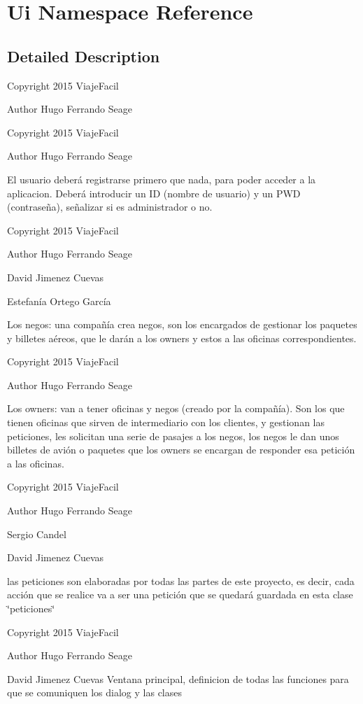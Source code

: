 \hypertarget{namespaceUi}{}\section{Ui Namespace Reference}
\label{namespaceUi}


\subsection{Detailed Description}
Copyright 2015 Viaje\+Facil \begin{DoxyAuthor}{Author}
Hugo Ferrando Seage
\end{DoxyAuthor}
Copyright 2015 Viaje\+Facil \begin{DoxyAuthor}{Author}
Hugo Ferrando Seage
\end{DoxyAuthor}
El usuario deberá registrarse primero que nada, para poder acceder a la aplicacion. Deberá introducir un I\+D (nombre de usuario) y un P\+W\+D (contraseña), señalizar si es administrador o no.

Copyright 2015 Viaje\+Facil \begin{DoxyAuthor}{Author}
Hugo Ferrando Seage 

David Jimenez Cuevas 

Estefanía Ortego García
\end{DoxyAuthor}
Los negos\+: una compañía crea negos, son los encargados de gestionar los paquetes y billetes aéreos, que le darán a los owners y estos a las oficinas correspondientes.

Copyright 2015 Viaje\+Facil \begin{DoxyAuthor}{Author}
Hugo Ferrando Seage
\end{DoxyAuthor}
Los owners\+: van a tener oficinas y negos (creado por la compañía). Son los que tienen oficinas que sirven de intermediario con los clientes, y gestionan las peticiones, les solicitan una serie de pasajes a los negos, los negos le dan unos billetes de avión o paquetes que los owners se encargan de responder esa petición a las oficinas.

Copyright 2015 Viaje\+Facil \begin{DoxyAuthor}{Author}
Hugo Ferrando Seage 

Sergio Candel 

David Jimenez Cuevas
\end{DoxyAuthor}
las peticiones son elaboradas por todas las partes de este proyecto, es decir, cada acción que se realice va a ser una petición que se quedará guardada en esta clase \char`\"{}peticiones\char`\"{}

Copyright 2015 Viaje\+Facil \begin{DoxyAuthor}{Author}
Hugo Ferrando Seage 

David Jimenez Cuevas Ventana principal, definicion de todas las funciones para que se comuniquen los dialog y las clases 
\end{DoxyAuthor}
